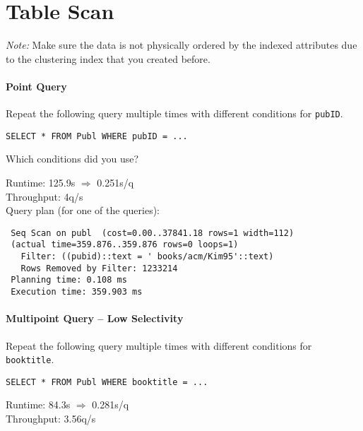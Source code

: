 \documentclass[11pt]{scrartcl}
\begin{document}
\section{Table Scan}

\noindent \emph{Note:} Make sure the data is not physically ordered by
the indexed attributes due to the clustering index that you created
before.

\paragraph{Point Query}

Repeat the following query multiple times with different conditions for {\tt pubID}.

{\small
\begin{verbatim}
SELECT * FROM Publ WHERE pubID = ...
\end{verbatim}
}

\noindent
Which conditions did you use?\\
\condA[500]

\smallskip\noindent
Runtime: 125.9s $\Rightarrow$ 0.251s/q\\
Throughput: 4q/s\\

\smallskip\noindent
Query plan (for one of the queries):
{\small
\begin{verbatim}
 Seq Scan on publ  (cost=0.00..37841.18 rows=1 width=112)
 (actual time=359.876..359.876 rows=0 loops=1)
   Filter: ((pubid)::text = ' books/acm/Kim95'::text)
   Rows Removed by Filter: 1233214
 Planning time: 0.108 ms
 Execution time: 359.903 ms
\end{verbatim}
}


\paragraph{Multipoint Query -- Low Selectivity}

Repeat the following query multiple times with different conditions for {\tt booktitle}.

{\small
\begin{verbatim}
SELECT * FROM Publ WHERE booktitle = ...
\end{verbatim}
}

\noindent
\condB[300]

\smallskip\noindent
Runtime: 84.3s $\Rightarrow$ 0.281s/q\\
Throughput: 3.56q/s\\
\end{document}
